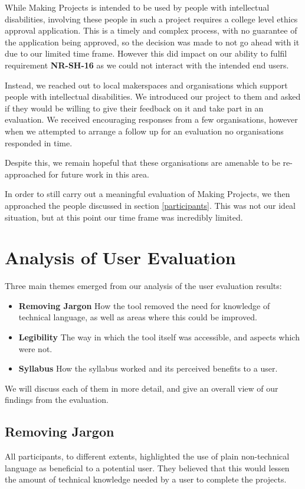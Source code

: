 \documentclass{l4proj}
\begin{document}
While Making Projects is intended to be used by people with intellectual disabilities, involving these people in such a project requires a college level ethics approval application. This is a timely and complex process, with no guarantee of the application being approved, so the decision was made to not go ahead with it due to our limited time frame. However this did impact on our ability to fulfil requirement \textbf{NR-SH-16} as we could not interact with the intended end users. 

Instead, we reached out to local makerspaces and organisations which support people with intellectual disabilities. We introduced our project to them and asked if they would be willing to give their feedback on it and take part in an evaluation. We received encouraging responses from a few organisations, however when we attempted to arrange a follow up for an evaluation no organisations responded in time.  

Despite this, we remain hopeful that these organisations are amenable to be re-approached for future work in this area. 

In order to still carry out a meaningful evaluation of Making Projects, we then approached the people discussed in section \ref{participants}. This was not our ideal situation, but at this point our time frame was incredibly limited. 


\section{Analysis of User Evaluation}
Three main themes emerged from our analysis of the user evaluation results:  
\begin{itemize}
    \item[] \textbf{Removing Jargon} How the tool removed the need for knowledge of technical language, as well as areas where this could be improved. 
    \item[] \textbf{Legibility} The way in which the tool itself was accessible, and aspects which were not. 
    \item[] \textbf{Syllabus} How the syllabus worked and its perceived benefits to a user.
\end{itemize}
We will discuss each of them in more detail, and give an overall view of our findings from the evaluation.

\subsection{Removing Jargon}
All participants, to different extents, highlighted the use of plain non-technical language as beneficial to a potential user. They believed that this would lessen the amount of technical knowledge needed by a user to complete the projects.
\end{document}
